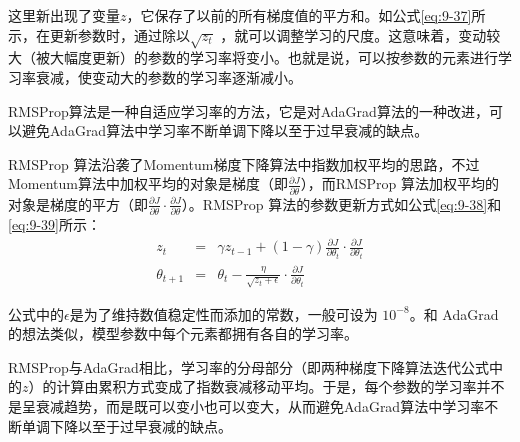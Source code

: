 \parinterval  这里新出现了变量$ z $，它保存了以前的所有梯度值的平方和。如公式\eqref{eq:9-37}所示，在更新参数时，通过除以${\sqrt{z_t}} $ ，就可以调整学习的尺度。这意味着，变动较大（被大幅度更新）的参数的学习率将变小。也就是说，可以按参数的元素进行学习率衰减，使变动大的参数的学习率逐渐减小。

%

\vspace{0.5em}
\vspace{0.5em}

\parinterval  RMSProp算法是一种自适应学习率的方法，它是对AdaGrad算法的一种改进，可以避免AdaGrad算法中学习率不断单调下降以至于过早衰减的缺点。

\parinterval  RMSProp 算法沿袭了Momentum梯度下降算法中指数加权平均的思路，不过Momentum算法中加权平均的对象是梯度（即$ \frac{\partial J}{\partial {\theta}}$），而RMSProp 算法加权平均的对象是梯度的平方（即$ \frac{\partial J}{\partial {\theta}} \cdot  \frac{\partial J}{\partial {\theta}} $）。RMSProp 算法的参数更新方式如公式\eqref{eq:9-38}和\eqref{eq:9-39}所示：
\begin{eqnarray}
z_t&=&\gamma z_{t-1}+(1-\gamma) \frac{\partial J}{\partial {\theta}_t} \cdot  \frac{\partial J}{\partial {\theta}_t}
\label{eq:9-38}\\
{\theta}_{t+1}&=&{\theta}_t-\frac{\eta}{\sqrt{z_t+\epsilon}}\cdot \frac{\partial J}{\partial {\theta}_t}
\label{eq:9-39}
\end{eqnarray}

\parinterval  公式中的$ \epsilon $是为了维持数值稳定性而添加的常数，一般可设为 $ 10^{-8} $。和 AdaGrad 的想法类似，模型参数中每个元素都拥有各自的学习率。

\parinterval  RMSProp与AdaGrad相比，学习率的分母部分（即两种梯度下降算法迭代公式中的$ z $）的计算由累积方式变成了指数衰减移动平均。于是，每个参数的学习率并不是呈衰减趋势，而是既可以变小也可以变大，从而避免AdaGrad算法中学习率不断单调下降以至于过早衰减的缺点。

%

\vspace{0.5em}
\vspace{0.5em}

